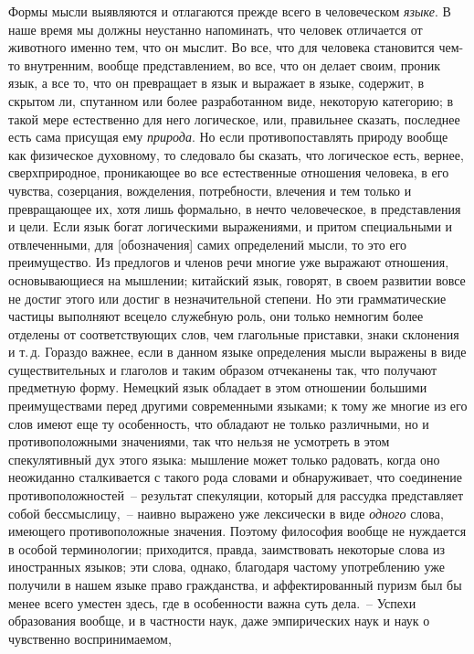 Формы мысли выявляются и отлагаются прежде всего
в человеческом \emph{языке}. В наше время мы должны неустанно
напоминать, что человек отличается от животного
именно тем, что он мыслит. Во все, что для человека
становится чем-то внутренним, вообще представлением, во
все, что он делает своим, проник язык, а все то, что он
превращает в язык и выражает в языке, содержит, в скрытом
ли, спутанном или более разработанном виде, некоторую
категорию; в такой мере естественно для него логическое,
или, правильнее сказать, последнее есть сама
присущая ему \emph{природа}. Но если противопоставлять природу
вообще как физическое духовному, то следовало бы
сказать, что логическое есть, вернее, сверхприродное, проникающее
во все естественные отношения человека, в его
чувства, созерцания, вожделения, потребности, влечения
и тем только и превращающее их, хотя лишь формально,
в нечто человеческое, в представления и цели. Если язык
богат логическими выражениями, и притом специальными
и отвлеченными, для [обозначения] самих определений
мысли, то это его преимущество. Из предлогов и членов
речи многие уже выражают отношения, основывающиеся
на мышлении; китайский язык, говорят, в своем развитии
вовсе не достиг этого или достиг в незначительной степени.
Но эти грамматические частицы выполняют всецело
служебную роль, они только немногим более отделены от
соответствующих слов, чем глагольные приставки, знаки
склонения и т.\,д. Гораздо важнее, если в данном языке
определения мысли выражены в виде существительных и
глаголов и таким образом отчеканены так, что получают
предметную форму. Немецкий язык обладает в этом отношении
большими преимуществами перед другими современными
языками; к тому же многие из его слов имеют
еще ту особенность, что обладают не только различными,
но и противоположными значениями, так что нельзя не
усмотреть в этом спекулятивный дух этого языка: мышление
может только радовать, когда оно неожиданно
сталкивается с такого рода словами и обнаруживает, что
соединение противоположностей~-- результат спекуляции,
который для рассудка представляет собой бессмыслицу,~--
наивно выражено уже лексически в виде \emph{одного} слова,
имеющего противоположные значения. Поэтому философия
вообще не нуждается в особой терминологии; приходится,
правда, заимствовать некоторые слова из иностранных
языков; эти слова, однако, благодаря частому
употреблению уже получили в нашем языке право гражданства,
и аффектированный пуризм был бы менее всего
уместен здесь, где в особенности важна суть дела.~--
Успехи образования вообще, и в частности наук, даже
эмпирических наук и наук о чувственно воспринимаемом,
